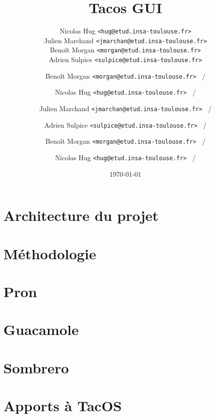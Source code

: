 \documentclass[xcolor=table,12pt]{beamer}
\title{Tacos GUI}
\author[Tacos GUI Team]{
\footnotesize
Nicolas Hug \texttt{<hug@etud.insa-toulouse.fr>}\\
Julien Marchand \texttt{<jmarchan@etud.insa-toulouse.fr>}\\
Benoît Morgan \texttt{<morgan@etud.insa-toulouse.fr>}\\
Adrien Sulpice \texttt{<sulpice@etud.insa-toulouse.fr>}\\
\normalsize
}
\institute{INSA de Toulouse}
\date{\today}
\begin{document}

\frame{\titlepage}


\author{Benoît Morgan \texttt{<morgan@etud.insa-toulouse.fr> } \insertframenumber/\inserttotalframenumber}
\section{Architecture du projet}


\author{Nicolas Hug \texttt{<hug@etud.insa-toulouse.fr> } \insertframenumber/\inserttotalframenumber}
\section{Méthodologie}


\author{Julien Marchand \texttt{<jmarchan@etud.insa-toulouse.fr> } \insertframenumber/\inserttotalframenumber}
\section{Pron}


\author{Adrien Sulpice \texttt{<sulpice@etud.insa-toulouse.fr> } \insertframenumber/\inserttotalframenumber}
\section{Guacamole}


\author{Benoît Morgan \texttt{<morgan@etud.insa-toulouse.fr> } \insertframenumber/\inserttotalframenumber}
\section{Sombrero}


\author{Nicolas Hug \texttt{<hug@etud.insa-toulouse.fr> } \insertframenumber/\inserttotalframenumber}
\section{Apports à TacOS}

\end{document}
